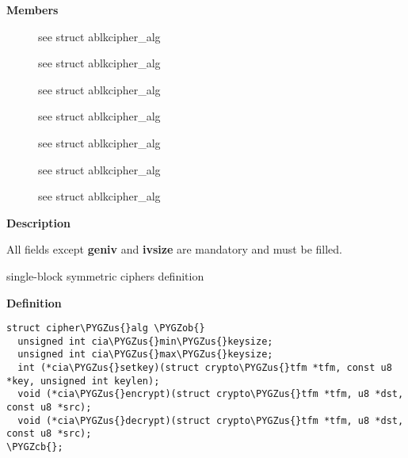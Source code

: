 \documentclass[a4paper,8pt,english]{sphinxmanual}
\def\PYGZus{\char`\_}
\def\PYGZob{\char`\{}
\def\PYGZcb{\char`\}}
\begin{document}
\textbf{Members}
\begin{description}
\item[{}] \leavevmode
see struct ablkcipher\_alg

\item[{}] \leavevmode
see struct ablkcipher\_alg

\item[{}] \leavevmode
see struct ablkcipher\_alg

\item[{}] \leavevmode
see struct ablkcipher\_alg

\item[{}] \leavevmode
see struct ablkcipher\_alg

\item[{}] \leavevmode
see struct ablkcipher\_alg

\item[{}] \leavevmode
see struct ablkcipher\_alg

\end{description}

\textbf{Description}

All fields except \textbf{geniv} and \textbf{ivsize} are mandatory and must be filled.

\begin{fulllineitems}
\label{crypto/api-skcipher:c.cipher_alg}
single-block symmetric ciphers definition

\end{fulllineitems}


\textbf{Definition}

\begin{Verbatim}[commandchars=\\\{\}]
struct cipher\PYGZus{}alg \PYGZob{}
  unsigned int cia\PYGZus{}min\PYGZus{}keysize;
  unsigned int cia\PYGZus{}max\PYGZus{}keysize;
  int (*cia\PYGZus{}setkey)(struct crypto\PYGZus{}tfm *tfm, const u8 *key, unsigned int keylen);
  void (*cia\PYGZus{}encrypt)(struct crypto\PYGZus{}tfm *tfm, u8 *dst, const u8 *src);
  void (*cia\PYGZus{}decrypt)(struct crypto\PYGZus{}tfm *tfm, u8 *dst, const u8 *src);
\PYGZcb{};
\end{Verbatim}
\end{document}
